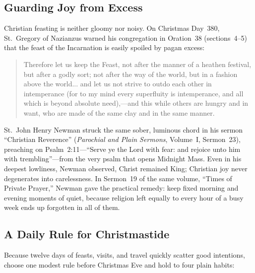 \subsection{Guarding Joy from Excess}

Christian feasting is neither gloomy nor noisy. On Christmas Day~380,
St.~Gregory of Nazianzus warned his congregation in Oration~38 (sections~4--5)
that the feast of the Incarnation is easily spoiled by pagan excess:

\begin{quote}
Therefore let us keep the Feast, not after the manner of a heathen festival,
but after a godly sort; not after the way of the world, but in a fashion above
the world... and let us not strive to outdo each other in intemperance (for to
my mind every superfluity is intemperance, and all which is beyond absolute
need),---and this while others are hungry and in want, who are made of the same
clay and in the same manner.
\end{quote}

St.~John Henry Newman struck the same sober, luminous chord in his sermon
``Christian Reverence'' (\textit{Parochial and Plain Sermons}, Volume~I,
Sermon~23), preaching on Psalm~2:11---``Serve ye the Lord with fear: and rejoice
unto him with trembling''---from the very psalm that opens Midnight Mass. Even
in his deepest lowliness, Newman observed, Christ remained King; Christian joy
never degenerates into carelessness. In Sermon~19 of the same volume, ``Times of
Private Prayer,'' Newman gave the practical remedy: keep fixed morning and
evening moments of quiet, because religion left equally to every hour of a busy
week ends up forgotten in all of them.

\subsection{A Daily Rule for Christmastide}

Because twelve days of feasts, visits, and travel quickly scatter good
intentions, choose one modest rule before Christmas Eve and hold to four plain
habits:

